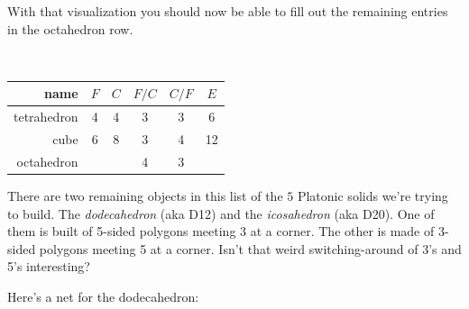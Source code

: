 With that visualization you should now be able to fill out the remaining entries in the octahedron row.

\

\setlength{\tabcolsep}{18pt}
\begin{tabular}{r|c|c|c|c|c} 
\bigstrut name        & $F$ & $C$ & $F/C$ & $C/F$ & $E$ \\ \hline
\bigstrut tetrahedron & 4   & 4   & 3     & 3     & 6 \\ \hline
\bigstrut cube        & 6   & 8   & 3     & 4     & 12 \\ \hline
\bigstrut octahedron  &     &     & 4     & 3     &   \\
\end{tabular}
\bigskip




\wbnewpage

There are two remaining objects in this list of the $5$ Platonic solids we're trying to build.
The {\em dodecahedron} (aka D12) and the {\em icosahedron} (aka D20).  One of them is built of 5-sided polygons meeting 3 at a corner.  The other is made of 3-sided polygons meeting 5 at a corner.  Isn't that weird switching-around of 3's and 5's interesting?

Here's a net for the dodecahedron:
\bigskip

